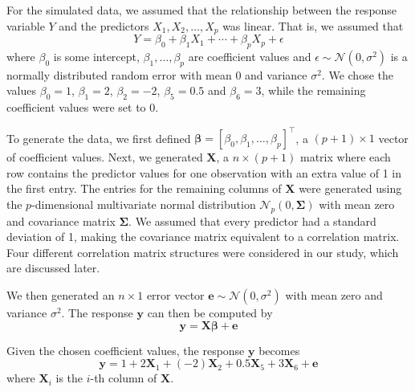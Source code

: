 \documentclass{article}
\begin{document}
For the simulated data, we assumed that the relationship between the response variable $Y$ and the predictors $X_1, X_2, \dotsc, X_p$ was linear. That is, we assumed that
\begin{equation}
	Y = \beta_0 + \beta_1 X_1 + \cdots + \beta_p X_p + \epsilon
\end{equation}
where $\beta_0$ is some intercept, $\beta_1, \dotsc, \beta_p$ are coefficient values and $\epsilon\sim \mathcal{N}(0, \sigma^2)$ is a normally distributed random error with mean 0 and variance $\sigma^2$. We chose the values $\beta_0 = 1$, $\beta_1 = 2$, $\beta_2 = -2$, $\beta_5=0.5$ and $\beta_6 = 3$, while the remaining coefficient values were set to 0.

To generate the data, we first defined $\bm{\beta} = [\beta_0, \beta_1, \dotsc, \beta_p]^\top$, a $(p + 1)\times 1$ vector of coefficient values. Next, we generated $\mathbf{X}$, a $n\times (p + 1)$ matrix where each row contains the predictor values for one observation with an extra value of 1 in the first entry. The entries for the remaining columns of $\mathbf{X}$ were generated using the $p$-dimensional multivariate normal distribution $\mathcal{N}_p(0, \mathbf{\Sigma})$ with mean zero and covariance matrix $\mathbf{\Sigma}$. We assumed that every predictor had a standard deviation of 1, making the covariance matrix equivalent to a correlation matrix. Four different correlation matrix structures were considered in our study, which are discussed later.

We then generated an $n\times 1$ error vector $\mathbf{e}\sim \mathcal{N}(0, \sigma^2)$ with mean zero and variance $\sigma^2$. The response $\mathbf{y}$ can then be computed by
\begin{equation}
	\mathbf{y} = \mathbf{X}\bm{\beta} + \mathbf{e}
\end{equation}

Given the chosen coefficient values, the response $\mathbf{y}$ becomes
\begin{equation}
	\mathbf{y} = 1 + 2\mathbf{X}_1 + (-2)\mathbf{X}_2 + 0.5\mathbf{X}_5 + 3\mathbf{X}_6 + \mathbf{e}
\end{equation}
where $\mathbf{X}_i$ is the $i$-th column of $\mathbf{X}$.
\end{document}
